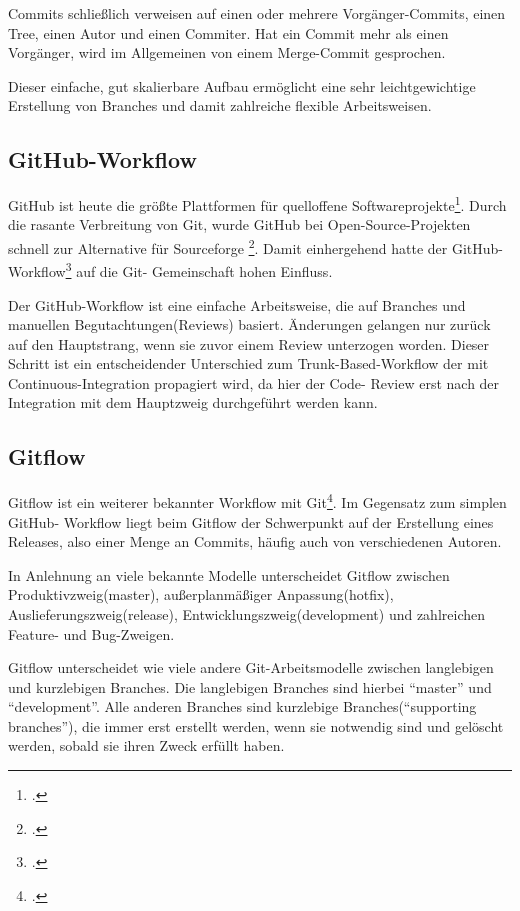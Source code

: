 Commits schließlich verweisen auf einen oder mehrere Vorgänger-Commits, einen Tree, einen Autor und einen Commiter. Hat ein Commit mehr als einen Vorgänger, wird im Allgemeinen von einem Merge-Commit gesprochen.

Dieser einfache, gut skalierbare Aufbau ermöglicht eine sehr leichtgewichtige Erstellung von Branches und damit 
zahlreiche flexible Arbeitsweisen.

\subsection{GitHub-Workflow}

GitHub ist heute die größte Plattformen für quelloffene Softwareprojekte\footcite[vgl.][]{github-marketshare-datanyze}. Durch die 
rasante Verbreitung von Git, wurde GitHub bei Open-Source-Projekten schnell zur Alternative für Sourceforge
\footcite[vgl.][]{heise-github-2011}. Damit einhergehend hatte der GitHub-Workflow\footcite[vgl.][]{github-workflow-intro} auf die Git-
Gemeinschaft hohen Einfluss.

Der GitHub-Workflow ist eine einfache Arbeitsweise, die auf Branches und manuellen Begutachtungen(Reviews) basiert. 
Änderungen gelangen nur zurück auf den Hauptstrang, wenn sie zuvor einem Review unterzogen worden. Dieser Schritt ist ein 
entscheidender Unterschied zum Trunk-Based-Workflow der mit Continuous-Integration propagiert wird, da hier der Code-
Review erst nach der Integration mit dem Hauptzweig durchgeführt werden kann.

\subsection{Gitflow}
\label{subsec:gitflow}

Gitflow ist ein weiterer bekannter Workflow mit Git\footcite[vgl.][]{nvie-git-branch-model}. Im Gegensatz zum simplen GitHub-
Workflow liegt beim Gitflow der Schwerpunkt auf der Erstellung eines Releases, also einer Menge an Commits, häufig auch
von verschiedenen Autoren.

In Anlehnung an viele bekannte Modelle unterscheidet Gitflow zwischen Produktivzweig(master), außerplanmäßiger 
Anpassung(hotfix), Auslieferungszweig(release), Entwicklungszweig(development) und zahlreichen Feature- und Bug-Zweigen.

Gitflow unterscheidet wie viele andere Git-Arbeitsmodelle zwischen langlebigen und kurzlebigen Branches. Die langlebigen 
Branches sind hierbei ``master'' und ``development''. Alle anderen Branches sind kurzlebige Branches(``supporting 
branches''), die immer erst erstellt werden, wenn sie notwendig sind und gelöscht werden, sobald sie ihren Zweck erfüllt 
haben.

